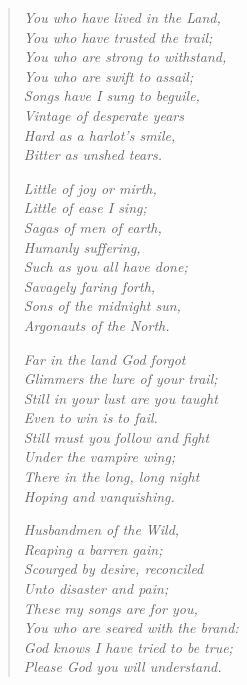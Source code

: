 

\begin{verse}

\textit{
You who have lived in the Land,\\
\idt You who have trusted the trail;\\
You who are strong to withstand,\\
\idt You who are swift to assail;\\
Songs have I sung to beguile,\\
\idt Vintage of desperate years\\
Hard as a harlot's smile,\\
\idt Bitter as unshed tears.
}

\indentedblock\itshape{
Little of joy or mirth,\\
\idt Little of ease I sing;\\
Sagas of men of earth,\\
\idt Humanly suffering,\\
Such as you all have done;\\
\idt Savagely faring forth,\\
Sons of the midnight sun,\\
\idt Argonauts of the North.
}

\textit{
Far in the land God forgot\\
\idt Glimmers the lure of your trail;\\
Still in your lust are you taught\\
\idt Even to win is to fail.\\
Still must you follow and fight\\
\idt Under the vampire wing;\\
There in the long, long night\\
\idt Hoping and vanquishing.
}

\indentedblock\itshape{
Husbandmen of the Wild,\\
\idt Reaping a barren gain;\\
Scourged by desire, reconciled\\
\idt Unto disaster and pain;\\
These my songs are for you,\\
\idt You who are seared with the brand:\\
God knows I have tried to be true;\\
\idt Please God you will understand.
}

\end{verse}
